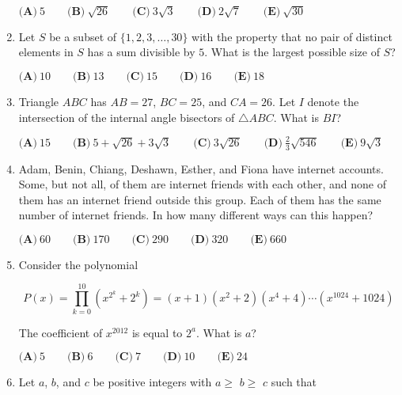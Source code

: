 \documentclass{article}
\begin{document}
\begin{enumerate}[label=\arabic*., itemsep=0.5em]
\( \textbf{(A)}\ 5\qquad\textbf{(B)}\ \sqrt{26}\qquad\textbf{(C)}\ 3\sqrt{3}\qquad\textbf{(D)}\ 2\sqrt{7}\qquad\textbf{(E)}\ \sqrt{30} \)\par \vspace{0.5em}\item Let \(S\) be a subset of \(\{1,2,3,\dots,30\}\) with the property that no pair of distinct elements in \(S\) has a sum divisible by \(5\).  What is the largest possible size of \(S\)?

\( \textbf{(A)}\ 10\qquad\textbf{(B)}\ 13\qquad\textbf{(C)}\ 15\qquad\textbf{(D)}\ 16\qquad\textbf{(E)}\ 18 \)\par \vspace{0.5em}\item Triangle \(ABC\) has \(AB=27\), \(BC=25\), and \(CA=26\).  Let \(I\) denote the intersection of the internal angle bisectors of \(\triangle ABC\).  What is \(BI\)?

\( \textbf{(A)}\ 15\qquad\textbf{(B)}\ 5+\sqrt{26}+3\sqrt{3}\qquad\textbf{(C)}\ 3\sqrt{26}\qquad\textbf{(D)}\ \frac{2}{3}\sqrt{546}\qquad\textbf{(E)}\ 9\sqrt{3} \)\par \vspace{0.5em}\item Adam, Benin, Chiang, Deshawn, Esther, and Fiona have internet accounts.  Some, but not all, of them are internet friends with each other, and none of them has an internet friend outside this group.  Each of them has the same number of internet friends.  In how many different ways can this happen?

\( \textbf{(A)}\ 60
\qquad\textbf{(B)}\ 170
\qquad\textbf{(C)}\ 290
\qquad\textbf{(D)}\ 320
\qquad\textbf{(E)}\ 660
 \)\par \vspace{0.5em}\item Consider the polynomial


\begin{equation*}
P(x)=\prod_{k=0}^{10}(x^{2^k}+2^k)=(x+1)(x^2+2)(x^4+4)\cdots (x^{1024}+1024)
\end{equation*}


The coefficient of \(x^{2012}\) is equal to \(2^a\).  What is \(a\)?

\( \textbf{(A)}\ 5
\qquad\textbf{(B)}\ 6
\qquad\textbf{(C)}\ 7
\qquad\textbf{(D)}\ 10
\qquad\textbf{(E)}\ 24
 \)\par \vspace{0.5em}\item Let \(a\), \(b\), and \(c\) be positive integers with \(a\ge\) \(b\ge\) \(c\) such that


\end{enumerate}
\end{document}
